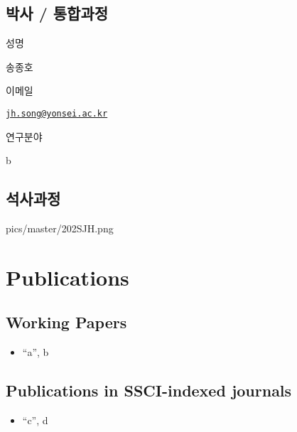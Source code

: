 \documentclass[
]{book}
\providecommand{\tightlist}{%
  \setlength{\itemsep}{0pt}\setlength{\parskip}{0pt}}
\begin{document}
\hypertarget{uxbc15uxc0ac-uxd1b5uxd569uxacfcuxc815}{%
\section*{박사 / 통합과정}\label{uxbc15uxc0ac-uxd1b5uxd569uxacfcuxc815}}

성명

송종호

이메일

\href{mailto:jh.song@yonsei.ac.kr}{\nolinkurl{jh.song@yonsei.ac.kr}}

연구분야

b

\hypertarget{uxc11duxc0acuxacfcuxc815}{%
\section*{석사과정}\label{uxc11duxc0acuxacfcuxc815}}

pics/master/202SJH.png

\hypertarget{publications}{%
\chapter*{Publications}\label{publications}}

\hypertarget{working-papers}{%
\section*{Working Papers}\label{working-papers}}

\begin{itemize}
\tightlist
\item
  ``a'', b
\end{itemize}

\hypertarget{publications-in-ssci-indexed-journals}{%
\section*{Publications in SSCI-indexed journals}\label{publications-in-ssci-indexed-journals}}

\begin{itemize}
\tightlist
\item
  ``c'', d
\end{itemize}

  
\end{document}
